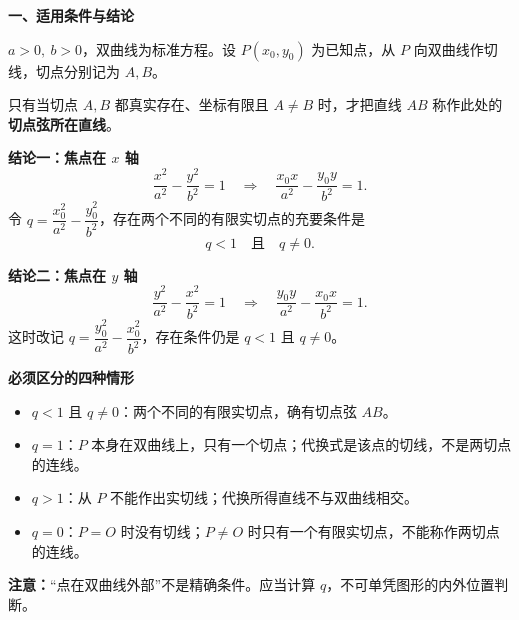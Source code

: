 \begin{statementbox}
\begin{center}

\end{center}
\textbf{\textcolor{CStatement}{一、适用条件与结论}}
\begin{description}[style=nextline,leftmargin=2.8em,labelsep=0.5em,itemsep=0.4em]
\item[\textbf{条件1（曲线）：}]
$a>0,\ b>0$，双曲线为标准方程。设 $P(x_0,y_0)$ 为已知点，从 $P$ 向双曲线作切线，切点分别记为 $A,B$。
\item[\textbf{条件2（两个不同的实切点）：}]
只有当切点 $A,B$ 都真实存在、坐标有限且 $A\ne B$ 时，才把直线 $AB$ 称作此处的\textbf{切点弦所在直线}。
\end{description}

\textbf{\textcolor{CStatement}{结论一：焦点在 $x$ 轴}}
\[
\frac{x^2}{a^2}-\frac{y^2}{b^2}=1
\quad\Longrightarrow\quad
\boxed{\frac{x_0x}{a^2}-\frac{y_0y}{b^2}=1}.
\]
令 $q=\dfrac{x_0^2}{a^2}-\dfrac{y_0^2}{b^2}$，存在两个不同的有限实切点的充要条件是
\[
\boxed{q<1\quad\text{且}\quad q\ne0}.
\]

\textbf{\textcolor{CStatement}{结论二：焦点在 $y$ 轴}}
\[
\frac{y^2}{a^2}-\frac{x^2}{b^2}=1
\quad\Longrightarrow\quad
\boxed{\frac{y_0y}{a^2}-\frac{x_0x}{b^2}=1}.
\]
这时改记 $q=\dfrac{y_0^2}{a^2}-\dfrac{x_0^2}{b^2}$，存在条件仍是 $q<1$ 且 $q\ne0$。

\medskip
\begin{minipage}{\linewidth}
\textbf{\textcolor{CStatement}{必须区分的四种情形}}
\begin{itemize}[leftmargin=*,itemsep=0.3em]
\item $q<1$ 且 $q\ne0$：两个不同的有限实切点，确有切点弦 $AB$。
\item $q=1$：$P$ 本身在双曲线上，只有一个切点；代换式是该点的切线，不是两切点的连线。
\item $q>1$：从 $P$ 不能作出实切线；代换所得直线不与双曲线相交。
\item $q=0$：$P=O$ 时没有切线；$P\ne O$ 时只有一个有限实切点，不能称作两切点的连线。
\end{itemize}\end{minipage}

\textbf{注意：}“点在双曲线外部”不是精确条件。应当计算 $q$，不可单凭图形的内外位置判断。
\end{statementbox}
